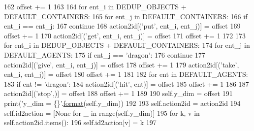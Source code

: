 \begin{DoxyCode}
162                 offset += 1
163 
164         \textcolor{keywordflow}{for} ent\_i \textcolor{keywordflow}{in} DEDUP\_OBJECTS + DEFAULT\_CONTAINERS:
165             \textcolor{keywordflow}{for} ent\_j \textcolor{keywordflow}{in} DEFAULT\_CONTAINERS:
166                 \textcolor{keywordflow}{if} ent\_i == ent\_j:
167                     \textcolor{keywordflow}{continue}
168                 action2id[(\textcolor{stringliteral}{'put'}, ent\_i, ent\_j)] = offset
169                 offset += 1
170                 action2id[(\textcolor{stringliteral}{'get'}, ent\_i, ent\_j)] = offset
171                 offset += 1
172 
173         \textcolor{keywordflow}{for} ent\_i \textcolor{keywordflow}{in} DEDUP\_OBJECTS + DEFAULT\_CONTAINERS:
174             \textcolor{keywordflow}{for} ent\_j \textcolor{keywordflow}{in} DEFAULT\_AGENTS:
175                 \textcolor{keywordflow}{if} ent\_j == \textcolor{stringliteral}{'dragon'}:
176                     \textcolor{keywordflow}{continue}
177                 action2id[(\textcolor{stringliteral}{'give'}, ent\_i, ent\_j)] = offset
178                 offset += 1
179                 action2id[(\textcolor{stringliteral}{'take'}, ent\_i, ent\_j)] = offset
180                 offset += 1
181 
182         \textcolor{keywordflow}{for} ent \textcolor{keywordflow}{in} DEFAULT\_AGENTS:
183             \textcolor{keywordflow}{if} ent != \textcolor{stringliteral}{'dragon'}:
184                 action2id[(\textcolor{stringliteral}{'hit'}, ent)] = offset
185                 offset += 1
186 
187         action2id[(\textcolor{stringliteral}{'stop'},)] = offset
188         offset += 1
189 
190         self.y\_dim = offset
191         print(\textcolor{stringliteral}{'y\_dim = \{\}'}.\hyperlink{namespaceparlai_1_1chat__service_1_1services_1_1messenger_1_1shared__utils_a32e2e2022b824fbaf80c747160b52a76}{format}(self.y\_dim))
192 
193         self.action2id = action2id
194         self.id2action = [\textcolor{keywordtype}{None} \textcolor{keywordflow}{for} \_ \textcolor{keywordflow}{in} range(self.y\_dim)]
195         \textcolor{keywordflow}{for} k, v \textcolor{keywordflow}{in} self.action2id.items():
196             self.id2action[v] = k
197 
\end{DoxyCode}
\mbox{\label{classprojects_1_1mastering__the__dungeon_1_1agents_1_1graph__world2_1_1agents_1_1DataAgentBase_ab6689897f975fd851e417e062d2f2f75}} 
